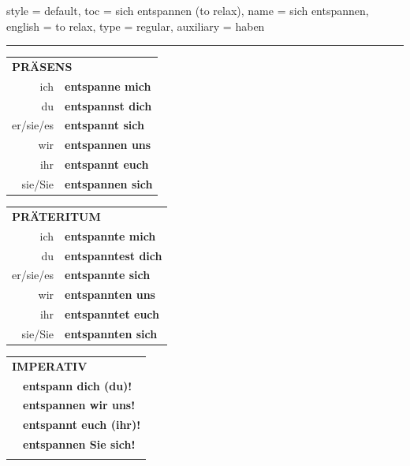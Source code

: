 \begin{verbentry}{
  style = {default},
  toc = {sich entspannen (to relax)},
  name = {sich entspannen},
  english = {to relax},
  type = {regular},
  auxiliary = {haben}
}
 
    
     \vspace{5pt}

    \hrule
    
    \vspace{5pt}

  \begin{tabular}{rl}
     \multicolumn{2}{l}{\textbf{PRÄSENS} }\\
    ich & \textbf{entspanne mich}\\
    du & \textbf{entspannst dich}\\
    er/sie/es & \textbf{entspannt sich}\\
    wir & \textbf{entspannen uns}\\
    ihr & \textbf{entspannt euch}\\
    sie/Sie & \textbf{entspannen sich}\\
  \end{tabular}
  \hfill
     \begin{tabular}{rl}
    \multicolumn{2}{l}{\textbf{PRÄTERITUM} }\\
    ich & \textbf{entspannte mich}\\
    du & \textbf{entspanntest dich}\\
    er/sie/es & \textbf{entspannte sich}\\
    wir & \textbf{entspannten uns}\\
    ihr & \textbf{entspanntet euch}\\
    sie/Sie & \textbf{entspannten sich}\\
  \end{tabular}
  \hfill
  \begin{tabular}{rl}
     \multicolumn{2}{l}{\textbf{IMPERATIV} }\\
   & \textbf{entspann dich (du)!}\\
   & \textbf{entspannen wir uns!}\\
   & \textbf{entspannt euch (ihr)!}\\
   & \textbf{entspannen Sie sich!}\\
   & \vspace{10pt}
  \end{tabular}

    \vspace{10pt}


\end{verbentry}
